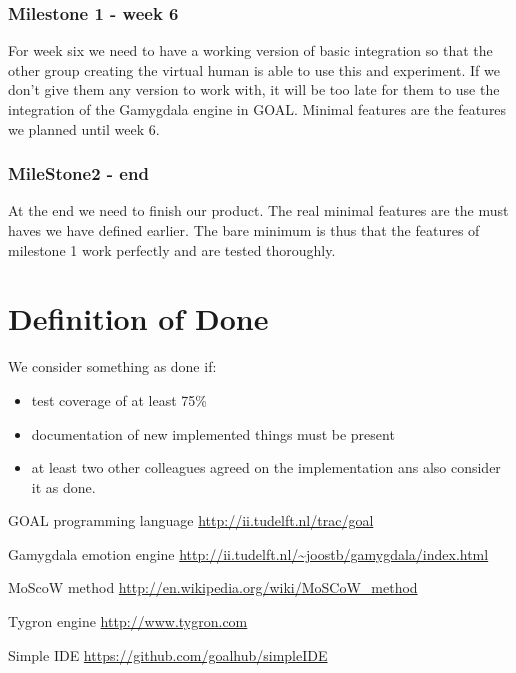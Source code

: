 \documentclass[]{article}
\begin{document}
\subsubsection{Milestone 1 - week 6}
For week six we need to have a working version of basic integration so that the other group creating the virtual human is able to use this and experiment. If we don't give them any version to work with, it will be too late for them to use the integration of the Gamygdala engine in GOAL. Minimal features are the features we planned until week 6.
\subsubsection{MileStone2 - end}
At the end we need to finish our product. The real minimal features are the must haves we have defined earlier. The bare minimum is thus that the features of milestone 1 work perfectly and are tested thoroughly.
\pagebreak
\section{Definition of Done}
We consider something as done if:
\begin{itemize}
	\item test coverage of at least 75\%
	\item documentation of new implemented things must be present
	\item at least two other colleagues agreed on the implementation ans also consider it as done.
\end{itemize}

\clearpage
\printglossaries


\begin{thebibliography}{9}
	
	GOAL programming language
	\url{http://ii.tudelft.nl/trac/goal}
	
	Gamygdala emotion engine
	\url{http://ii.tudelft.nl/~joostb/gamygdala/index.html}
	
	MoScoW method
	\url{http://en.wikipedia.org/wiki/MoSCoW_method }
	
	Tygron engine
	\url{http://www.tygron.com }
	
	Simple IDE
	\url{https://github.com/goalhub/simpleIDE }
	
	
\end{thebibliography}
\end{document}
